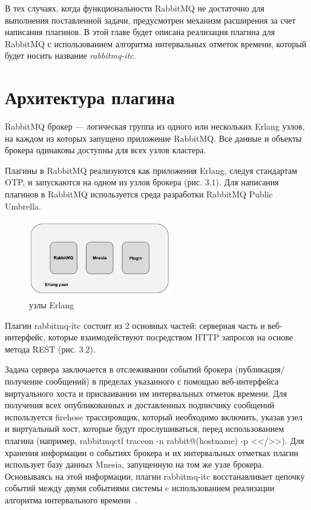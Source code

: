 В тех случаях, когда функциональности RabbitMQ не достаточно для выполнения поставленной задачи, предусмотрен механизм расширения за счет написания плагинов. В этой главе будет описана реализация плагина для RabbitMQ с использованием алгоритма интервальных отметок времени, который будет носить название \textit{rabbitmq-itc}.

\section{Архитектура плагина}
RabbitMQ брокер --- логическая группа из одного или нескольких Erlang узлов, на каждом из которых запущено приложение RabbitMQ. Все данные и объекты брокера одинаковы доступны для всех узлов кластера.

Плагины в RabbitMQ реализуются как приложения Erlang, следуя стандартам OTP, и запускаются на одном из узлов брокера (рис. 3.1). Для написания плагинов в RabbitMQ используется среда разработки RabbitMQ Public Umbrella.

\begin{figure}
\centering
\includegraphics[width=0.55\textwidth]{img/node.png}
\caption{узлы Erlang}
\end{figure}
Плагин rabbitmq-itc состоит из 2 основных частей: серверная часть и веб-интерфейс, которые взаимодействуют посредством HTTP запросов на основе метода REST (рис. 3.2).

Задача сервера заключается в отслеживании событий брокера (публикация/получение сообщений) в пределах указанного с помощью веб-интерфейса  виртуального хоста и присваивании им интервальных отметок времени. Для получения всех опубликованных и доставленных подписчику сообщений используется  firehose трассировщик, который необходимо включить, указав узел и виртуальный хост, которые будут прослушиваться, перед использованием плагина (например, rabbitmqctl trace\underline{\hspace{0.25cm}}on -n rabbit@(hostname) -p <</>>). Для хранения информации о событиях брокера и их интервальных отметках плагин использует базу данных Mnesia, запущенную на том же узле брокера. Основываясь на этой информации, плагин rabbitmq-itc восстанавливает цепочку событий между двумя событиями системы c использованием реализации алгоритма интервального времени~\cite{itc}.


